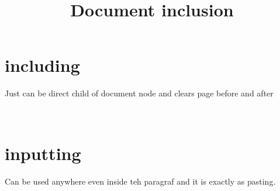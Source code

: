 \documentclass[a4paper]{article}
\title{Document inclusion}
\date{}
\begin{document}
    \maketitle
    \section{including}
        Just can be direct child of document node and clears page before and after
        \begin{verbatim}
            
        \end{verbatim}
    \section{inputting}
        Can be used anywhere even inside teh paragraf and it is exactly as pasting.
        \begin{verbatim}
            
        \end{verbatim}
\end{document}
